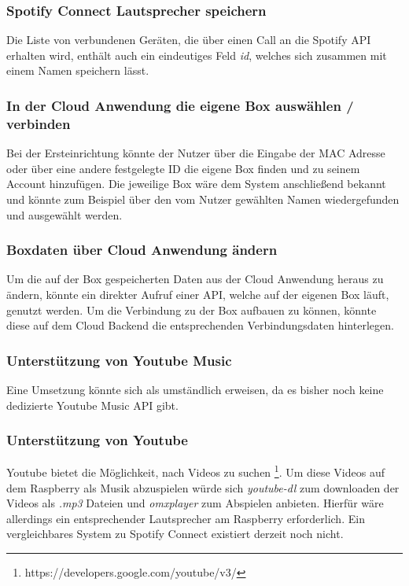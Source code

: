 \documentclass[10pt, a4paper]{article}
\begin{document}
\subsubsection{Spotify Connect Lautsprecher speichern}
Die Liste von verbundenen Geräten, die über einen Call an die Spotify API erhalten wird, enthält auch ein eindeutiges Feld \textit{id}, welches sich zusammen mit einem Namen speichern lässt.

\subsubsection{In der Cloud Anwendung die eigene Box auswählen / verbinden}
Bei der Ersteinrichtung könnte der Nutzer über die Eingabe der MAC Adresse oder über eine andere festgelegte ID die eigene Box finden und zu seinem Account hinzufügen. Die jeweilige Box wäre dem System anschließend bekannt und könnte zum Beispiel über den vom Nutzer gewählten Namen wiedergefunden und ausgewählt werden.

\subsubsection{Boxdaten über Cloud Anwendung ändern}
Um die auf der Box gespeicherten Daten aus der Cloud Anwendung heraus zu ändern, könnte ein direkter Aufruf einer API, welche auf der eigenen Box läuft, genutzt werden. Um die Verbindung zu der Box aufbauen zu können, könnte diese auf dem Cloud Backend die entsprechenden Verbindungsdaten hinterlegen.
\subsubsection{Unterstützung von Youtube Music}
Eine Umsetzung könnte sich als umständlich erweisen, da es bisher noch keine dedizierte Youtube Music API gibt.

\subsubsection{Unterstützung von Youtube}
Youtube bietet die Möglichkeit, nach Videos zu suchen \footnote{https://developers.google.com/youtube/v3/}. Um diese Videos auf dem Raspberry als Musik abzuspielen würde sich \textit{youtube-dl} zum downloaden der Videos als \textit{.mp3} Dateien und \textit{omxplayer} zum Abspielen anbieten.
Hierfür wäre allerdings ein entsprechender Lautsprecher am Raspberry erforderlich. Ein vergleichbares System zu Spotify Connect existiert derzeit noch nicht.
\end{document}
